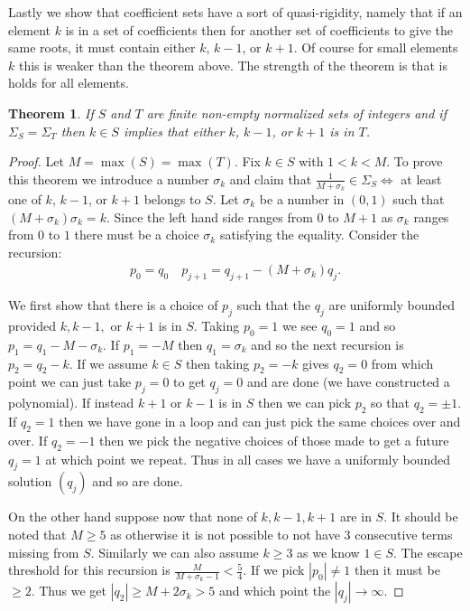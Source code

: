 \documentclass[11pt]{amsart}
\newtheorem{theorem}{Theorem}
\numberwithin{theorem}{section} %
\numberwithin{corollary}{section}
\numberwithin{lemma}{section}
\numberwithin{proposition}{section}
\numberwithin{definition}{section}
\begin{document}
Lastly we show that coefficient sets have a sort of quasi-rigidity, namely that if an element $k$ is in a set of coefficients then for another set of coefficients to give the same roots, it must contain either $k$, $k-1$, or $k+1$. Of course for small elements $k$ this is weaker than the theorem above. The strength of the theorem is that is holds for all elements.

\begin{theorem}
\label{quasirigidity}
If $S$ and $T$ are finite non-empty normalized sets of integers and if $\Sigma_S = \Sigma_T$ then $k \in S$ implies that either $k$, $k-1$, or $k+1$ is in $T$.
\end{theorem}

\begin{proof}
Let $M = \max(S) = \max(T)$. Fix $k \in S$ with $1 < k < M$. To prove this theorem we introduce a number $\sigma_k$ and claim that $\frac{1}{M+\sigma_k} \in \Sigma_S \iff $ at least one of $k$, $k-1$, or $k+1$ belongs to $S$. Let $\sigma_k$ be a number in $(0, 1)$ such that $(M+\sigma_k)\sigma_k = k$. Since the left hand side ranges from $0$ to $M+1$ as $\sigma_k$ ranges from $0$ to $1$ there must be a choice $\sigma_k$ satisfying the equality. Consider the recursion:
\begin{align*}
p_0 = q_0 \quad p_{j+1} = q_{j+1} - (M+\sigma_k) q_j.
\end{align*}

We first show that there is a choice of $p_j$ such that the $q_j$ are uniformly bounded provided $k, k-1,$ or $k+1$ is in $S$. Taking $p_0 = 1$ we see $q_0 = 1$ and so $p_1 = q_1 - M - \sigma_k$. If $p_1 = -M$ then $q_1 = \sigma_k$ and so the next recursion is $p_2 = q_2 - k$. If we assume $k \in S$ then taking $p_2 = -k$ gives $q_2 = 0$ from which point we can just take $p_j = 0$ to get $q_j = 0$ and are done (we have constructed a polynomial). If instead $k+1$ or $k-1$ is in $S$ then we can pick $p_2$ so that $q_2 = \pm 1$. If $q_2 = 1$ then we have gone in a loop and can just pick the same choices over and over. If $q_2 = -1$ then we pick the negative choices of those made to get a future $q_j = 1$ at which point we repeat. Thus in all cases we have a uniformly bounded solution $(q_j)$ and so are done.

On the other hand suppose now that none of $k, k-1, k+1$ are in $S$. It should be noted that $M \geqslant 5$ as otherwise it is not possible to not have 3 consecutive terms missing from $S$. Similarly we can also assume $k \geqslant 3$ as we know $1 \in S$. The escape threshold for this recursion is $\frac{M}{M+\sigma_k-1} < \frac{5}{4}$. If we pick $|p_0| \neq 1$ then it must be $\geqslant 2$. Thus we get $|q_2| \geq M + 2\sigma_k > 5$ and which point the $|q_j| \rightarrow \infty$.


\end{proof}
\end{document}

